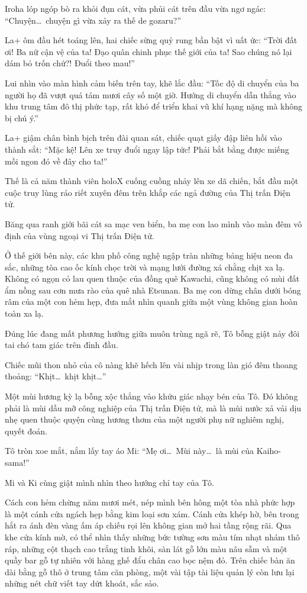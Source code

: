 \documentclass[../main.tex]{subfiles}
\begin{document}
Iroha lóp ngóp bò ra khỏi đụn cát, vừa phủi cát trên đầu vừa ngơ ngác: ``Chuyện\dots\ chuyện gì vừa xảy ra thế de gozaru?''

La+ ôm đầu hét toáng lên, hai chiếc sừng quỷ rung bần bật vì uất ức: ``Trời đất ơi! Ba nữ cận vệ của ta! Đạo quân chinh phục thế giới của ta! Sao chúng nó lại dám bỏ trốn chứ?! Đuổi theo mau!''

Lui nhìn vào màn hình cảm biến trên tay, khẽ lắc đầu: ``Tốc độ di chuyển của ba người họ đã vượt quá tám mươi cây số một giờ. Hướng di chuyển dẫn thẳng vào khu trung tâm đô thị phức tạp, rất khó để triển khai vũ khí hạng nặng mà không bị chú ý.''

La+ giậm chân bình bịch trên đài quan sát, chiếc quạt giấy đập liên hồi vào thành sắt: ``Mặc kệ! Lên xe truy đuổi ngay lập tức! Phải bắt bằng được miếng mồi ngon đó về đây cho ta!''

Thế là cả năm thành viên holoX cuống cuồng nhảy lên xe dã chiến, bắt đầu một cuộc truy lùng ráo riết xuyên đêm trên khắp các ngả đường của Thị trấn Điện tử.

\ct

Băng qua ranh giới bãi cát sa mạc ven biển, ba mẹ con lao mình vào màn đêm vô định của vùng ngoại vi Thị trấn Điện tử.

Ở thế giới bên này, các khu phố công nghệ ngập tràn những bảng hiệu neon đa sắc, những tòa cao ốc kính chọc trời và mạng lưới đường xá chằng chịt xa lạ. Không có ngọn cỏ lau quen thuộc của đồng quê Kawachi, cũng không có mùi đất ẩm nồng sau cơn mưa rào của quê nhà Etsunan. Ba mẹ con dừng chân dưới bóng râm của một con hẻm hẹp, đưa mắt nhìn quanh giữa một vùng không gian hoàn toàn xa lạ.

Đúng lúc đang mất phương hướng giữa muôn trùng ngã rẽ, Tô bỗng giật nảy đôi tai chó tam giác trên đỉnh đầu.

Chiếc mũi thon nhỏ của cô nàng khẽ hếch lên vài nhịp trong làn gió đêm thoang thoảng: ``Khịt\dots\ khịt khịt\dots''

Một mùi hương kỳ lạ bỗng xộc thẳng vào khứu giác nhạy bén của Tô. Đó không phải là mùi dầu mỡ công nghiệp của Thị trấn Điện tử, mà là mùi nước xả vải dịu nhẹ quen thuộc quyện cùng hương thơm của một người phụ nữ nghiêm nghị, quyết đoán.

Tô tròn xoe mắt, nắm lấy tay áo Mi: ``Mẹ ơi\dots\ Mùi này\dots\ là mùi của Kaiho-sama!''

Mi và Ki cùng giật mình nhìn theo hướng chỉ tay của Tô.

Cách con hẻm chừng năm mươi mét, nép mình bên hông một tòa nhà phức hợp là một cánh cửa ngách hẹp bằng kim loại sơn xám. Cánh cửa khép hờ, bên trong hắt ra ánh đèn vàng ấm áp chiếu rọi lên không gian mở hai tầng rộng rãi. Qua khe cửa kính mờ, có thể nhìn thấy những bức tường sơn màu tím nhạt nhám thô ráp, những cột thạch cao trắng tinh khôi, sàn lát gỗ lớn màu nâu sẫm và một quầy bar gỗ tự nhiên với hàng ghế đẩu chân cao bọc nệm đỏ. Trên chiếc bàn ăn dài bằng gỗ thô ở trung tâm căn phòng, một vài tập tài liệu quản lý còn lưu lại những nét chữ viết tay dứt khoát, sắc sảo.
\end{document}
